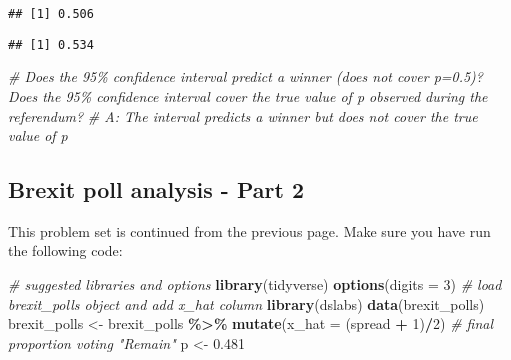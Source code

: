 \documentclass[
]{article}
\newenvironment{Shaded}{\begin{snugshade}}{\end{snugshade}}
\newcommand{\CommentTok}[1]{\textcolor[rgb]{0.56,0.35,0.01}{\textit{#1}}}
\newcommand{\DataTypeTok}[1]{\textcolor[rgb]{0.13,0.29,0.53}{#1}}
\newcommand{\DecValTok}[1]{\textcolor[rgb]{0.00,0.00,0.81}{#1}}
\newcommand{\FloatTok}[1]{\textcolor[rgb]{0.00,0.00,0.81}{#1}}
\newcommand{\KeywordTok}[1]{\textcolor[rgb]{0.13,0.29,0.53}{\textbf{#1}}}
\newcommand{\NormalTok}[1]{#1}
\newcommand{\OperatorTok}[1]{\textcolor[rgb]{0.81,0.36,0.00}{\textbf{#1}}}
\newcommand{\StringTok}[1]{\textcolor[rgb]{0.31,0.60,0.02}{#1}}
\begin{document}
\begin{verbatim}
## [1] 0.506
\end{verbatim}

\begin{Shaded}
\end{Shaded}

\begin{verbatim}
## [1] 0.534
\end{verbatim}

\begin{Shaded}
\begin{Highlighting}[]
\CommentTok{\# Does the 95\% confidence interval predict a winner (does not cover p=0.5)? Does the 95\% confidence interval cover the true value of p observed during the referendum?}
\CommentTok{\# A: The interval predicts a winner but does not cover the true value of p}
\end{Highlighting}
\end{Shaded}

\hypertarget{brexit-poll-analysis---part-2}{%
\subsection{Brexit poll analysis - Part
2}\label{brexit-poll-analysis---part-2}}

This problem set is continued from the previous page. Make sure you have
run the following code:

\begin{Shaded}
\begin{Highlighting}[]
\CommentTok{\# suggested libraries and options}
\KeywordTok{library}\NormalTok{(tidyverse)}
\KeywordTok{options}\NormalTok{(}\DataTypeTok{digits =} \DecValTok{3}\NormalTok{)}
\CommentTok{\# load brexit\_polls object and add x\_hat column}
\KeywordTok{library}\NormalTok{(dslabs)}
\KeywordTok{data}\NormalTok{(brexit\_polls)}
\NormalTok{brexit\_polls \textless{}{-}}\StringTok{ }\NormalTok{brexit\_polls }\OperatorTok{\%\textgreater{}\%}
\StringTok{    }\KeywordTok{mutate}\NormalTok{(}\DataTypeTok{x\_hat =}\NormalTok{ (spread }\OperatorTok{+}\StringTok{ }\DecValTok{1}\NormalTok{)}\OperatorTok{/}\DecValTok{2}\NormalTok{)}
\CommentTok{\# final proportion voting "Remain"}
\NormalTok{p \textless{}{-}}\StringTok{ }\FloatTok{0.481}
\end{Highlighting}
\end{Shaded}
\end{document}
